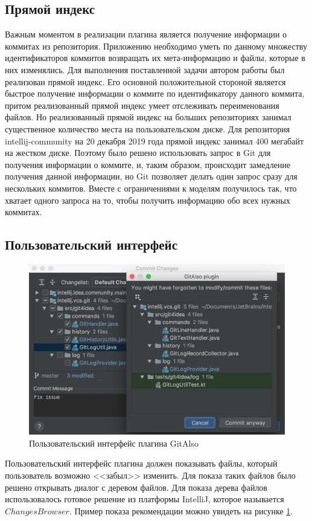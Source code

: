 \subsection{Прямой индекс}\label{forward-index}
Важным моментом в реализации плагина является получение информации о коммитах из репозитория. Приложению необходимо уметь по данному множеству идентификаторов коммитов возвращать их мета-информацию и файлы, которые в них изменялись. Для выполнения поставленной задачи автором работы был реализован прямой индекс. Его основной положительной стороной является быстрое получение информации о коммите по идентификатору данного коммита, притом реализованный прямой индекс умеет отслеживать переименования файлов. Но реализованный прямой индекс на больших репозиториях занимал существенное количество места на пользовательском диске. Для репозитория intellij-community на 20 декабря 2019 года прямой индекс занимал 400 мегабайт на жестком диске. Поэтому было решено использовать запрос в Git для получения информации о коммите, и, таким образом, происходит замедление получения данной информации, но Git позволяет делать один запрос сразу для нескольких коммитов. Вместе с ограничениями к моделям получилось так, что хватает одного запроса на то, чтобы получить информацию обо всех нужных коммитах.
\subsection{Пользовательский интерфейс}\label{git-also-ui}
\begin{figure}[!h]
\caption{Пользовательский интерфейс плагина GitAlso}\label{git-also-screen}
\centering
\includegraphics[scale=0.6]{images/GitAlso.png}
\end{figure}
Пользовательский интерфейс плагина должен показывать файлы, который пользователь возможно <<забыл>> изменить. Для показа таких файлов было решено открывать диалог с деревом файлов. Для показа дерева файлов использовалось готовое решение из платформы IntelliJ, которое называется $ChangesBrowser$. Пример показа рекомендации можно увидеть на рисунке  \ref{git-also-screen}.
